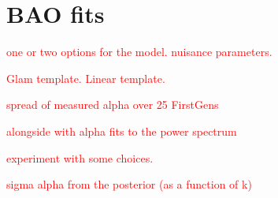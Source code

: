 \section{BAO fits}
\label{sec:fits}

\textcolor{red}{one or two options for the model. nuisance parameters.}

\textcolor{red}{Glam template. Linear template.}

\textcolor{red}{spread of measured alpha over 25 FirstGens}

\textcolor{red}{alongside with alpha fits to the power spectrum}

\textcolor{red}{experiment with some choices.}

\textcolor{red}{sigma alpha from the posterior (as a function of k)}



